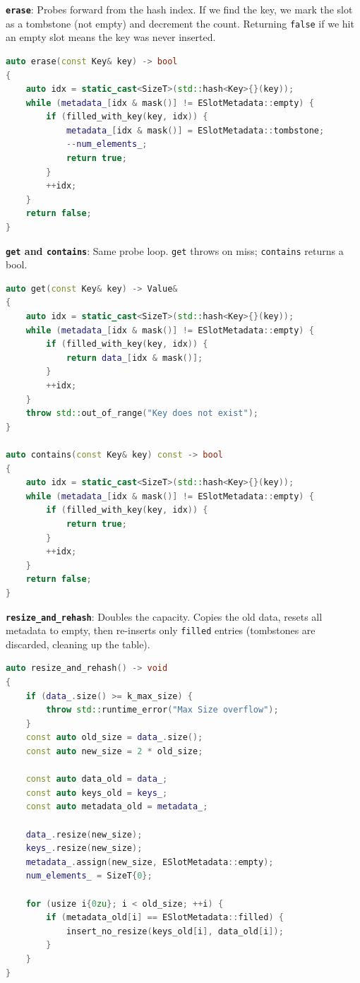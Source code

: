 \documentclass{article}
\begin{document}
\textbf{\texttt{erase}}: Probes forward from the hash index. If we find the key, we mark the slot as a tombstone (not empty) and decrement the count. Returning \texttt{false} if we hit an empty slot means the key was never inserted.

\begin{lstlisting}[language=cpp,caption={erase}]
auto erase(const Key& key) -> bool
{
    auto idx = static_cast<SizeT>(std::hash<Key>{}(key));
    while (metadata_[idx & mask()] != ESlotMetadata::empty) {
        if (filled_with_key(key, idx)) {
            metadata_[idx & mask()] = ESlotMetadata::tombstone;
            --num_elements_;
            return true;
        }
        ++idx;
    }
    return false;
}
\end{lstlisting}

\textbf{\texttt{get} and \texttt{contains}}: Same probe loop. \texttt{get} throws on miss; \texttt{contains} returns a bool.

\begin{lstlisting}[language=cpp,caption={get and contains}]
auto get(const Key& key) -> Value&
{
    auto idx = static_cast<SizeT>(std::hash<Key>{}(key));
    while (metadata_[idx & mask()] != ESlotMetadata::empty) {
        if (filled_with_key(key, idx)) {
            return data_[idx & mask()];
        }
        ++idx;
    }
    throw std::out_of_range("Key does not exist");
}

auto contains(const Key& key) const -> bool
{
    auto idx = static_cast<SizeT>(std::hash<Key>{}(key));
    while (metadata_[idx & mask()] != ESlotMetadata::empty) {
        if (filled_with_key(key, idx)) {
            return true;
        }
        ++idx;
    }
    return false;
}
\end{lstlisting}

\textbf{\texttt{resize\_and\_rehash}}: Doubles the capacity. Copies the old data, resets all metadata to empty, then re-inserts only \texttt{filled} entries (tombstones are discarded, cleaning up the table).

\begin{lstlisting}[language=cpp,caption={resize\_and\_rehash}]
auto resize_and_rehash() -> void
{
    if (data_.size() >= k_max_size) {
        throw std::runtime_error("Max Size overflow");
    }
    const auto old_size = data_.size();
    const auto new_size = 2 * old_size;

    const auto data_old = data_;
    const auto keys_old = keys_;
    const auto metadata_old = metadata_;

    data_.resize(new_size);
    keys_.resize(new_size);
    metadata_.assign(new_size, ESlotMetadata::empty);
    num_elements_ = SizeT{0};

    for (usize i{0zu}; i < old_size; ++i) {
        if (metadata_old[i] == ESlotMetadata::filled) {
            insert_no_resize(keys_old[i], data_old[i]);
        }
    }
}
\end{lstlisting}
\end{document}
